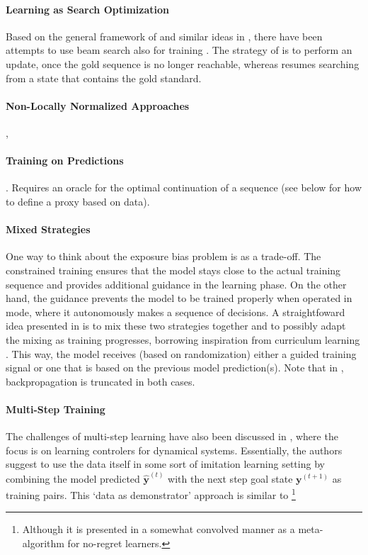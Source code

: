 \documentclass{article}
\newcommand{\up}[1]{^{(#1)}}
\newcommand{\y}{{\mathbf y}}
\begin{document}
\paragraph{Learning as Search Optimization} Based on the general framework of \cite{daume2005learning} and similar ideas in \cite{collins2004incremental}, there have been attempts to use beam search also for training \cite{wiseman2016sequence}. The strategy of \cite{collins2004incremental} is to perform an update, once the gold sequence is no longer reachable, whereas \cite{daume2005learning} resumes searching from a state that contains the gold standard. 

\paragraph{Non-Locally Normalized Approaches} \cite{sak2014sequence}, \cite{voigtlaender2015sequence}

\paragraph{Training on Predictions} \cite{daume2009search}. Requires an oracle for the optimal continuation of a sequence (see below \cite{venkatraman2015improving} for how to define a proxy based on data). 

\paragraph{Mixed Strategies} One way to think about the exposure bias problem is as a trade-off. The constrained training ensures that the model stays close to the actual training sequence and provides additional guidance in  the learning phase. On the other hand, the guidance prevents the model to be trained properly when operated in mode, where it autonomously makes a sequence of decisions. A straightfoward idea presented in \cite{bengio2015scheduled} is to mix these two strategies together and to possibly adapt the mixing as training progresses, borrowing inspiration from curriculum learning \cite{bengio2009curriculum}. This way, the model receives (based on randomization) either a guided training signal or one that is based on the previous model prediction(s). Note that in \cite{bengio2015scheduled}, backpropagation is truncated in both cases. 



\paragraph{Multi-Step Training} The challenges of multi-step learning have also been discussed in \cite{venkatraman2015improving}, where the focus is on learning controlers for dynamical systems. Essentially, the authors suggest to use the data itself in some sort of imitation learning setting by combining the model predicted $\hat \y \up t$ with the next step goal state $\y\up{t+1}$ as training pairs. This `data as demonstrator' approach is similar to \cite{bengio2015scheduled}\footnote{Although it is presented in a somewhat convolved manner as a meta-algorithm for no-regret learners.}
\end{document}
